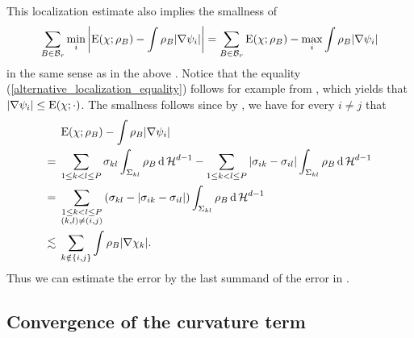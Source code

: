 \begin{remark}
	\label{localization_estimate_weaker}
	This localization estimate also implies the smallness of
	\begin{equation}
		\label{alternative_localization_equality}
		\sum_{ B \in \mathcal{ B }_{ r } }
		\min_{ i }
		\abs{
			\operatorname{E} ( \chi; \rho_{ B } )
			-
			\int
			\rho_{ B }
			\abs{ \nabla \psi_{ i } }
		}
		=
		\sum_{ B \in \mathcal{ B }_{ r } }
		\operatorname{E} ( \chi ; \rho_{ B } )
		-
		\max_{ i }
		\int
		\rho_{ B }
		\abs{ \nabla \psi_{ i } }
	\end{equation}
	in the same sense as in the above . 
	Notice that the equality (\ref{alternative_localization_equality}) follows 
	for example from 
	, which yields that $ \abs{ 
	\nabla 
		\psi_{ i } } \leq \operatorname{E} ( \chi ; \cdot )$. The smallness follows 
		since by 
	, we have for every $ i \neq j $ that
	\begin{align*}
		&
		\operatorname{E} ( \chi ; \rho_{ B } ) 
		-
		\int
		\rho_{ B }
		\abs{ \nabla \psi_{ i } }
		\\
		={} &
		\sum_{ 1 \leq k < l \leq P }
		\sigma_{ k l }
		\int_{ \Sigma_{ k l } }
		\rho_{ B }
		\dd{ \operatorname{\mathcal{H}}^{ d -1 } }
		-
		\sum_{ 1 \leq k < l \leq P }
		\abs{ \sigma_{ i k } - \sigma_{ i l } }
		\int_{ \Sigma_{ k l } }
		\rho_{ B }
		\dd{ \operatorname{\mathcal{H}}^{ d - 1 } }
		\\
		={} &
		\sum_{ \substack{1 \leq k < l \leq P \\ ( k, l ) \neq ( i, j ) } }
		\left(
		\sigma_{ k l } - \abs{ \sigma_{ i k } - \sigma_{ i l } }
		\right)
		\int_{ \Sigma_{ k l } }
		\rho_{ B }
		\dd{ \operatorname{\mathcal{H}}^{ d - 1 } }
		\\
		\lesssim{} &
		\sum_{ k \notin \{ i, j \} }
		\int
		\rho_{ B }
		\abs{ \nabla \chi_{ k } }.
	\end{align*}
	Thus we can estimate the error by the last summand of the error in 
	.
\end{remark}
\subsection{Convergence of the curvature term}


